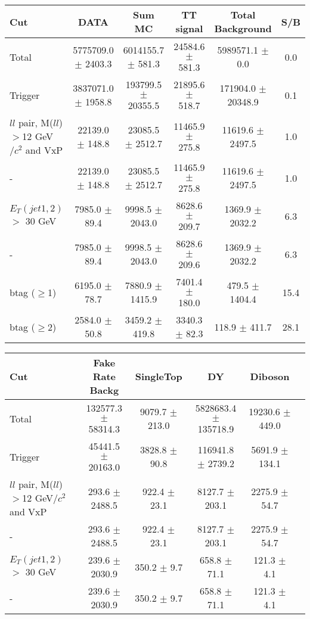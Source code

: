 \documentclass[amsmath,amssymb]{revtex4}
\begin{document}
\begin{landscape}
\begin{table}[p]
\begin{tabular}{|l|c|c|c|c|c|}
\hline
\hline
Cut & DATA & Sum MC & TT signal  & Total Background & S/B \\
\hline
Total & 5775709.0 $\pm$ 2403.3 & 6014155.7 $\pm$ 581.3 & 24584.6 $\pm$ 581.3 & 5989571.1 $\pm$ 0.0 & 0.0 \\
Trigger & 3837071.0 $\pm$ 1958.8 & 193799.5 $\pm$ 20355.5 & 21895.6 $\pm$ 518.7 & 171904.0 $\pm$ 20348.9 & 0.1 \\
$ll$ pair, M($ll$)$>$12 GeV$/c^2$ and VxP & 22139.0 $\pm$ 148.8 & 23085.5 $\pm$ 2512.7 & 11465.9 $\pm$ 275.8 & 11619.6 $\pm$ 2497.5 & 1.0 \\
 -  & 22139.0 $\pm$ 148.8 & 23085.5 $\pm$ 2512.7 & 11465.9 $\pm$ 275.8 & 11619.6 $\pm$ 2497.5 & 1.0 \\
$E_T(jet1,2)$ $>$ 30 GeV & 7985.0 $\pm$ 89.4 & 9998.5 $\pm$ 2043.0 & 8628.6 $\pm$ 209.7 & 1369.9 $\pm$ 2032.2 & 6.3 \\
 -  & 7985.0 $\pm$ 89.4 & 9998.5 $\pm$ 2043.0 & 8628.6 $\pm$ 209.6 & 1369.9 $\pm$ 2032.2 & 6.3 \\
btag ($\ge$1) & 6195.0 $\pm$ 78.7 & 7880.9 $\pm$ 1415.9 & 7401.4 $\pm$ 180.0 & 479.5 $\pm$ 1404.4 & 15.4 \\
btag ($\ge$2) & 2584.0 $\pm$ 50.8 & 3459.2 $\pm$ 419.8 & 3340.3 $\pm$ 82.3 & 118.9 $\pm$ 411.7 & 28.1 \\
\hline
\hline
\end{tabular}
\begin{tabular}{|l|c|c|c|c|c|}
\hline
\hline
Cut & Fake Rate Backg & SingleTop & DY & Diboson  \\
\hline
Total & 132577.3 $\pm$ 58314.3 & 9079.7 $\pm$ 213.0 & 5828683.4 $\pm$ 135718.9 & 19230.6 $\pm$ 449.0 \\
Trigger & 45441.5 $\pm$ 20163.0 & 3828.8 $\pm$ 90.8 & 116941.8 $\pm$ 2739.2 & 5691.9 $\pm$ 134.1 \\
$ll$ pair, M($ll$)$>$12 GeV$/c^2$ and VxP & 293.6 $\pm$ 2488.5 & 922.4 $\pm$ 23.1 & 8127.7 $\pm$ 203.1 & 2275.9 $\pm$ 54.7 \\
 -  & 293.6 $\pm$ 2488.5 & 922.4 $\pm$ 23.1 & 8127.7 $\pm$ 203.1 & 2275.9 $\pm$ 54.7 \\
$E_T(jet1,2)$ $>$ 30 GeV & 239.6 $\pm$ 2030.9 & 350.2 $\pm$ 9.7 & 658.8 $\pm$ 71.1 & 121.3 $\pm$ 4.1 \\
 -  & 239.6 $\pm$ 2030.9 & 350.2 $\pm$ 9.7 & 658.8 $\pm$ 71.1 & 121.3 $\pm$ 4.1 \\

\end{tabular}
\end{table}
\end{landscape}
\end{document}
